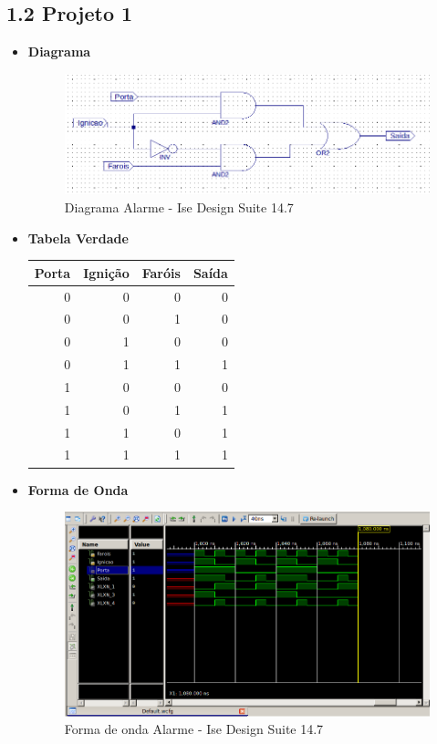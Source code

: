 \documentclass[12pts]{article}
\begin{document}
\subsection{1.2 Projeto 1}

\begin{itemize}
	\item \textbf{Diagrama}

\begin{figure}[!htb]
  \centering
  \includegraphics[scale=0.5]{imagens/diagrama01}
  \caption{Diagrama Alarme - Ise Design Suite 14.7}
  \label{figRotulo}
\end{figure}		
	
	\item \textbf{Tabela Verdade}
\begin{center}
	\begin{tabular}{|r|r|r|r|}
		\hline
		Porta & Ignição & Faróis & Saída \\
		\hline
		0 & 0 & 0 & 0 \\
		\hline
		0 & 0 & 1 & 0 \\
		\hline
		0 & 1 & 0 & 0 \\
		\hline
		0 & 1 & 1 & 1 \\
		\hline
		1 & 0 & 0 & 0 \\
		\hline
		1 & 0 & 1 & 1 \\
		\hline
		1 & 1 & 0 & 1 \\
		\hline
		1 & 1 & 1 & 1 \\
		\hline
	\end{tabular}
\end{center}

	\item \textbf{Forma de Onda}	

\begin{figure}[!htb]
  \centering
  \includegraphics[scale=0.5]{imagens/projeto01}
  \caption{Forma de onda Alarme - Ise Design Suite 14.7}
  \label{figRotulo}
\end{figure}				
	
\end{itemize}
\end{document}
